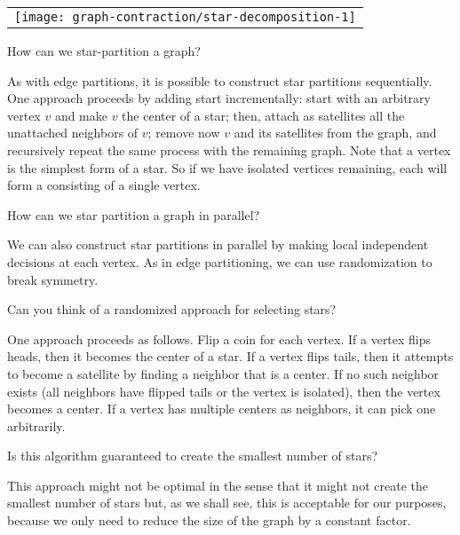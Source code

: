 {\begin{example}
\begin{center}
\small
\begin{tabular}{lll}
\multicolumn{3}{c}{
\texttt{[image: graph-contraction/star-decomposition-1]}
}
\end{tabular}
\label{ex:gc::star}
\end{center}
\end{example}



\begin{question}
How can we star-partition a graph? 
\end{question} 

As with edge partitions, it is possible to construct star partitions
sequentially.  One approach proceeds by adding start incrementally:  start with an arbitrary vertex $v$ and make $v$ the center
of a star; then, attach as satellites all the unattached neighbors of
$v$;  remove now $v$ and its satellites from the graph, and
recursively repeat the same process with the remaining graph.
%
Note that a vertex is the simplest form of a star.  
%
So if we have isolated vertices remaining, each will form a
 consisting of a single vertex.

\begin{question}
How can we star partition a graph in parallel? 
\end{question} 
%
We can also construct star partitions in parallel by making local
independent decisions at each vertex.  As in edge partitioning, we can
use randomization to break symmetry.
%
\begin{question}
Can you think of a randomized approach for selecting stars?
\end{question}
%
One approach proceeds as follows. 
%
Flip a coin for each vertex.
%
If a vertex flips heads, then it becomes the center of a star. 
%
If a vertex flips tails, then it attempts to become a satellite by
finding a neighbor that is a center. 
%
If no such neighbor exists (all neighbors have flipped tails or the
vertex is isolated), then the vertex becomes a center.
%
If a vertex has multiple centers as neighbors, it can pick one
arbitrarily.
%
\begin{question}
Is this algorithm guaranteed to create the smallest number of stars?
\end{question}
%
This approach might not be optimal in the sense that it might not create
the smallest number of stars but, as we shall see, this is acceptable
for our purposes, because we  only need to reduce the size
of the graph by a constant factor.  

}
